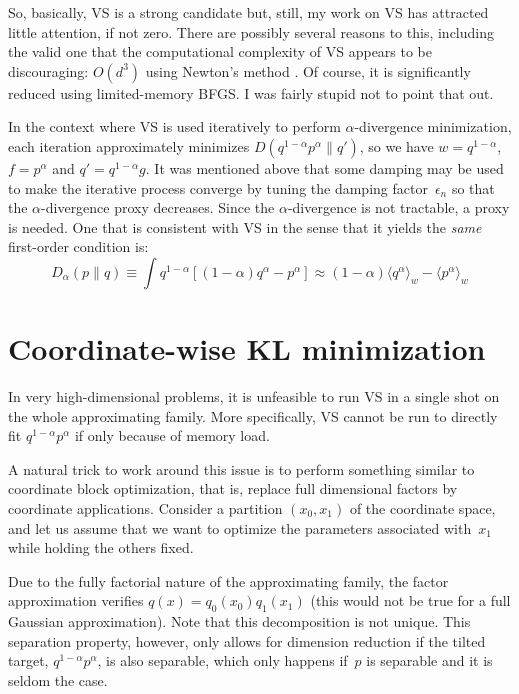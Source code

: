 \documentclass{article}
\begin{document}
So, basically, VS is a strong candidate but, still, my work on VS has attracted little attention, if not zero. There are possibly several reasons to this, including the valid one that the computational complexity of VS appears to be discouraging: $O(d^3)$ using Newton's method \cite{rr:16}. Of course, it is significantly reduced using limited-memory BFGS. I was fairly stupid not to point that out.


In the context where VS is used iteratively to perform $\alpha$-divergence minimization, each iteration approximately minimizes $D(q^{1-\alpha}p^\alpha\|q')$, so we have $w=q^{1-\alpha}$, $f=p^\alpha$ and $q'=q^{1-\alpha}g$. It was mentioned above that some damping may be used to make the iterative process converge by tuning the damping factor~$\epsilon_n$ so that the $\alpha$-divergence proxy decreases. Since the $\alpha$-divergence is not tractable, a proxy is needed. One that is consistent with VS in the sense that it yields the {\em same} first-order condition is:
$$
D_\alpha (p\|q) 
\equiv 
\int q^{1-\alpha} [(1-\alpha)q^\alpha - p^\alpha]
\approx 
(1-\alpha)\langle q^\alpha \rangle_w - \langle p^\alpha \rangle_w
$$



\section{Coordinate-wise KL minimization}

In very high-dimensional problems, it is unfeasible to run VS in a single shot on the whole approximating family. More specifically, VS cannot be run to directly fit $q^{1-\alpha}p^\alpha$ if only because of memory load.

A natural trick to work around this issue is to perform something similar to coordinate block optimization, that is, replace full dimensional factors by coordinate applications. Consider a partition $(x_0,x_1)$ of the coordinate space, and let us assume that we want to optimize the parameters associated with~$x_1$ while holding the others fixed. 

Due to the fully factorial nature of the approximating family, the factor approximation verifies $q(x)=q_0(x_0)q_1(x_1)$ (this would not be true for a full Gaussian approximation). Note that this decomposition is not unique.
This separation property, however, only allows for dimension reduction if the tilted target, $q^{1-\alpha}p^\alpha$, is also separable, which only happens if~$p$ is separable and it is seldom the case. 
\end{document}
